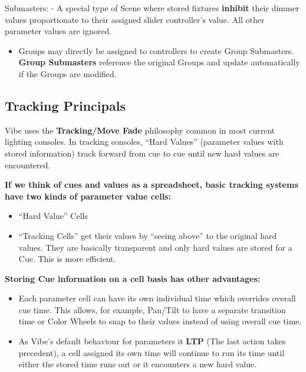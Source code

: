 \documentclass[
]{article}
\providecommand{\tightlist}{%
  \setlength{\itemsep}{0pt}\setlength{\parskip}{0pt}}
\begin{document}
Submasters:
- A special type of Scene where stored fixtures \textbf{inhibit} their dimmer values proportionate to their assigned slider controller's value. All other parameter values are ignored.

\begin{itemize}
\tightlist
\item
  Groups may directly be assigned to controllers to create Group Submasters. \textbf{Group Submasters} reference the original Groups and update automatically if the Groups are modified.
\end{itemize}

\hypertarget{tracking-principals}{%
\subsection{Tracking Principals}\label{tracking-principals}}

Vibe uses the \textbf{Tracking/Move Fade} philosophy common in most current lighting consoles. In tracking consoles, ``Hard Values'' (parameter values with stored information) track forward from cue to cue until new hard values are encountered.

\textbf{If we think of cues and values as a spreadsheet, basic tracking systems have two kinds of parameter value cells:}

\begin{itemize}
\item
  ``Hard Value'' Cells
\item
  ``Tracking Cells'' get their values by ``seeing above'' to the original hard values. They are basically transparent and only hard values are stored for a Cue. This is more efficient.
\end{itemize}

\textbf{Storing Cue information on a cell basis has other advantages:}

\begin{itemize}
\item
  Each parameter cell can have its own individual time which overrides overall cue time. This allows, for example, Pan/Tilt to have a separate transition time or Color Wheels to snap to their values instead of using overall cue time.
\item
  As Vibe's default behaviour for parameters it \textbf{LTP} (The last action takes precedent), a cell assigned its own time will continue to run its time until either the stored time runs out or it encounters a new hard value.
\end{itemize}
\end{document}
